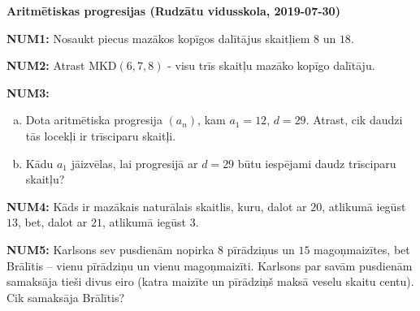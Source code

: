 \documentclass[11pt]{article}
\newenvironment{uzdevums}[1][\unskip]{%
\vspace{3mm}
\noindent
\textbf{#1:}
\noindent}
{}
\begin{document}
\thispagestyle{empty}

{\Large \bf Aritmētiskas progresijas (Rudzātu vidusskola, 2019-07-30)}


\begin{uzdevums}[NUM1]
Nosaukt piecus mazākos kopīgos dalītājus skaitļiem 
$8$ un $18$. 
\end{uzdevums}




\begin{uzdevums}[NUM2]
Atrast $\mbox{MKD}(6,7,8)$ - visu trīs skaitļu mazāko kopīgo dalītāju.
\end{uzdevums}

\begin{uzdevums}[NUM3]
\begin{enumerate}[(a)]
\item Dota aritmētiska progresija $(a_n)$, kam $a_1 = 12$, $d = 29$. 
Atrast, cik daudzi tās locekļi ir trīsciparu skaitļi.  
\item Kādu $a_1$ jāizvēlas, lai progresijā ar $d=29$ būtu iespējami 
daudz trīsciparu skaitļu?
\end{enumerate}
\end{uzdevums}


\begin{uzdevums}[NUM4]
Kāds ir mazākais naturālais skaitlis, kuru, dalot ar $20$, atlikumā iegūst $13$, 
bet, dalot ar $21$, atlikumā iegūst $3$.
\end{uzdevums}

\begin{uzdevums}[NUM5]
Karlsons sev pusdienām nopirka $8$ pīrādziņus un $15$ magoņmaizītes, bet
Brālītis – vienu pīrādziņu un vienu magoņmaizīti. Karlsons par savām
pusdienām samaksāja tieši divus eiro (katra maizīte un pīrādziņš maksā veselu
skaitu centu). Cik samaksāja Brālītis?
\end{uzdevums}
\end{document}
